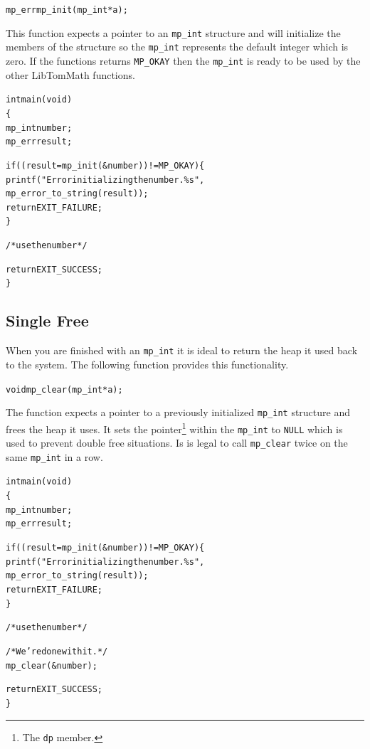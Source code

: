 \documentclass[synpaper]{book}
\begin{document}
\begin{alltt}
mp_err mp_init (mp_int *a);
\end{alltt}

This function expects a pointer to an \texttt{mp\_int} structure and will initialize the members
of the structure so the \texttt{mp\_int} represents the default integer which is zero.  If the
functions returns \texttt{MP\_OKAY} then the \texttt{mp\_int} is ready to be used by the other
LibTomMath functions.

\begin{small}
  \begin{alltt}
int main(void)
\{
   mp_int number;
   mp_err result;

   if ((result = mp_init(&number)) != MP_OKAY) \{
      printf("Error initializing the number.  \%s",
             mp_error_to_string(result));
      return EXIT_FAILURE;
   \}

   /* use the number */

   return EXIT_SUCCESS;
\}
  \end{alltt}
\end{small}

\subsection{Single Free}
When you are finished with an \texttt{mp\_int} it is ideal to return the heap it used back to the
system.  The following function provides this functionality.
\begin{alltt}
void mp_clear (mp_int *a);
\end{alltt}

The function expects a pointer to a previously initialized \texttt{mp\_int} structure and frees the
heap it uses.  It sets the pointer\footnote{The \texttt{dp} member.} within the \texttt{mp\_int} to
\texttt{NULL} which is used to prevent double free situations. Is is legal to call
\texttt{mp\_clear} twice on the same \texttt{mp\_int} in a row.

\begin{small}
  \begin{alltt}
int main(void)
\{
   mp_int number;
   mp_err result;

   if ((result = mp_init(&number)) != MP_OKAY) \{
      printf("Error initializing the number.  \%s",
             mp_error_to_string(result));
      return EXIT_FAILURE;
   \}

   /* use the number */

   /* We're done with it. */
   mp_clear(&number);

   return EXIT_SUCCESS;
\}
  \end{alltt}
\end{small}
\end{document}

